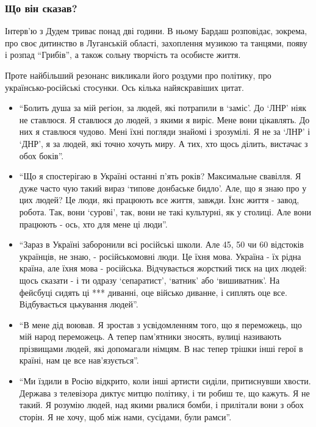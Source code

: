 \subsubsection{Що він сказав?}

Інтерв'ю з Дудем триває понад дві години. В ньому Бардаш розповідає, зокрема,
про своє дитинство в Луганській області, захоплення музикою та танцями, появу і
розпад \enquote{Грибів}, а також сольну творчість та особисте життя.

Проте найбільший резонанс викликали його роздуми про політику, про
українсько-російські стосунки. Ось кілька найяскравіших цитат.

\begin{itemize}
				\item \enquote{Болить душа за мій регіон, за людей, які потрапили в
								\enquote{заміс}. До \enquote{ЛНР} ніяк не ставлюся. Я ставлюся до людей, з
								якими я виріс. Мене вони цікавлять. До них я ставлюся чудово.
								Мені їхні погляди знайомі і зрозумілі. Я не за \enquote{ЛНР} і \enquote{ДНР}, я
								за людей, які точно хочуть миру. А тих, хто щось ділить,
								вистачає з обох боків}.

    \item \enquote{Що я спостерігаю в Україні останні п'ять років? Максимальне свавілля. Я дуже часто чую такий вираз 
						\enquote{типове донбаське бидло}. Але, що я знаю про у цих людей? Це люди, які працюють все життя, завжди. 
						Їхнє життя - завод, робота. Так, вони \enquote{сурові}, так, вони не такі культурні, як у столиці. 
						Але вони працюють - ось, хто для мене ці люди}.

    \item \enquote{Зараз в Україні заборонили всі російські школи. Але 45, 50 чи 60 відстоків українців, не знаю, - російськомовні люди. Це їхня мова. Україна - їх рідна країна, але їхня мова - російська. Відчувається жорсткий тиск на цих людей: щось сказати - і ти одразу
\enquote{сепаратист}, 
\enquote{ватник} або \enquote{вишиватник}. 
На фейсбуці сидять ці *** диванні, оце військо диванне, і сиплять оце все. Відбувається цькування людей}.

		\item \enquote{В мене дід воював. Я зростав з усвідомленням того, що я
						переможець, що мій народ переможець. А тепер пам'ятники зносять,
						вулиці називають прізвищами людей, які допомагали німцям. В нас
						тепер трішки інші герої в країні, нам це все нав'язується}.

		\item \enquote{Ми їздили в Росію відкрито, коли інші артисти сиділи,
притиснувши хвости. Держава з телевізора диктує митцю політику, і
ти робиш те, що кажуть. Я не такий. Я розумію людей, над якими
рвалися бомби, і прилітали вони з обох сторін. Я не хочу, щоб
між нами, сусідами, були рамси}.
\end{itemize}
